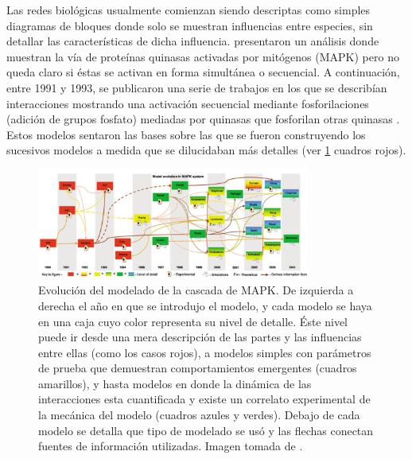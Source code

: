 Las redes biológicas usualmente comienzan siendo descriptas como simples diagramas de bloques donde solo se muestran influencias entre especies, sin detallar las características de dicha influencia. \cite{Ahn1990} presentaron un análisis donde muestran la vía de proteínas quinasas activadas por mitógenos (MAPK) pero no queda claro si éstas se activan en forma simultánea o secuencial. A continuación, entre 1991 y 1993, se publicaron una serie de trabajos en los que se describían interacciones mostrando una activación secuencial mediante fosforilaciones (adición de grupos fosfato) mediadas por quinasas que fosforilan otras quinasas \citep{Ahn1991, Itoh1993}. Estos modelos sentaron las bases sobre las que se fueron construyendo los sucesivos modelos a medida que se dilucidaban más detalles (ver \cref{fig:evolucion_modelos} cuadros rojos).

\begin{figure}
    \centering
    \includegraphics[width=0.8\textwidth]{img/cap_1/model_evolution.png}
    \caption{\footnotesize{Evolución del modelado de la cascada de MAPK. De izquierda a derecha el año en que se introdujo el modelo, y cada modelo se haya en una caja cuyo color representa su nivel de detalle. Éste nivel puede ir desde una mera descripción de las partes y las influencias entre ellas (como los casos rojos), a modelos simples con parámetros de prueba que demuestran comportamientos emergentes (cuadros amarillos), y hasta modelos en donde la dinámica de las interacciones esta cuantificada y existe un correlato experimental de la mecánica del modelo (cuadros azules y verdes). Debajo de cada modelo se detalla que tipo de modelado se usó y las flechas conectan fuentes de información utilizadas. Imagen tomada de \cite{Vayttaden2004}.}}
    \label{fig:evolucion_modelos}
\end{figure}

